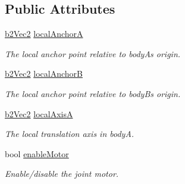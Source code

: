 \subsection*{Public Attributes}
\begin{DoxyCompactItemize}
\item 
\mbox{\label{structb2WheelJointDef_a9429d2273bfdd8bdc0db416e73b89ae4}} 
\mbox{\hyperlink{structb2Vec2}{b2\+Vec2}} \mbox{\hyperlink{structb2WheelJointDef_a9429d2273bfdd8bdc0db416e73b89ae4}{local\+AnchorA}}
\begin{DoxyCompactList}\small\item\em The local anchor point relative to bodyA\textquotesingle{}s origin. \end{DoxyCompactList}\item 
\mbox{\label{structb2WheelJointDef_a88ba0f7108076b9d7ced68425be95c27}} 
\mbox{\hyperlink{structb2Vec2}{b2\+Vec2}} \mbox{\hyperlink{structb2WheelJointDef_a88ba0f7108076b9d7ced68425be95c27}{local\+AnchorB}}
\begin{DoxyCompactList}\small\item\em The local anchor point relative to bodyB\textquotesingle{}s origin. \end{DoxyCompactList}\item 
\mbox{\label{structb2WheelJointDef_ad635ee7b77b50037dc0e021a0f5c93a6}} 
\mbox{\hyperlink{structb2Vec2}{b2\+Vec2}} \mbox{\hyperlink{structb2WheelJointDef_ad635ee7b77b50037dc0e021a0f5c93a6}{local\+AxisA}}
\begin{DoxyCompactList}\small\item\em The local translation axis in bodyA. \end{DoxyCompactList}\item 
\mbox{\label{structb2WheelJointDef_a8e7193d6c34c784ffd71e79d3a70acc6}} 
bool \mbox{\hyperlink{structb2WheelJointDef_a8e7193d6c34c784ffd71e79d3a70acc6}{enable\+Motor}}
\begin{DoxyCompactList}\small\item\em Enable/disable the joint motor. \end{DoxyCompactList}\item 
\mbox{\label{structb2WheelJointDef_ab658ce0fae40c6de09133659f7ffb829}} 

\end{DoxyCompactItemize}

